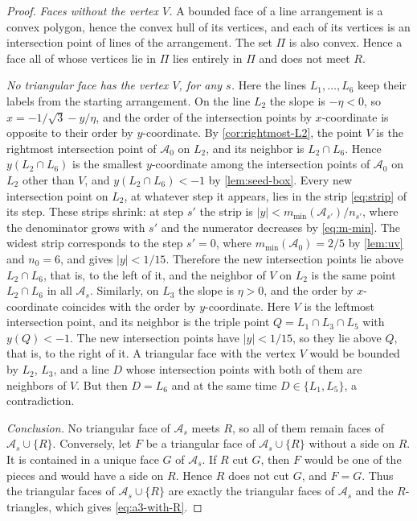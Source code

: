 \begin{proof}
\emph{Faces without the vertex $V$.} A bounded face of a line arrangement is a convex polygon, hence the convex hull of its vertices, and each of its vertices is an intersection point of lines of the arrangement.
The set $\Pi$ is also convex. Hence a face all of whose vertices lie in $\Pi$ lies entirely in $\Pi$ and does not meet $R$.

\emph{No triangular face has the vertex $V$, for any $s$.}
Here the lines $L_1,\ldots,L_6$ keep their labels from the starting arrangement.
On the line $L_2$ the slope is $-\eta<0$, so $x=-1/\sqrt3-y/\eta$, and the order of the intersection points by $x$-coordinate is opposite to their order by $y$-coordinate.
By \cref{cor:rightmost-L2}, the point $V$ is the rightmost intersection point of $\mathcal A_0$ on $L_2$, and its neighbor is $L_2\cap L_6$. Hence $y(L_2\cap L_6)$ is the smallest $y$-coordinate among the intersection points of $\mathcal A_0$ on $L_2$ other than $V$, and $y(L_2\cap L_6)<-1$ by \cref{lem:seed-box}.
Every new intersection point on $L_2$, at whatever step it appears, lies in the strip \eqref{eq:strip} of its step.
These strips shrink: at step $s'$ the strip is $|y|<m_{\min}(\mathcal A_{s'})/n_{s'}$, where the denominator grows with $s'$ and the numerator decreases by \eqref{eq:m-min}.
The widest strip corresponds to the step $s'=0$, where $m_{\min}(\mathcal A_0)=2/5$ by \cref{lem:uv} and $n_0=6$, and gives $|y|<1/15$.
Therefore the new intersection points lie above $L_2\cap L_6$, that is, to the left of it, and the neighbor of $V$ on $L_2$ is the same point $L_2\cap L_6$ in all $\mathcal A_s$.
Similarly, on $L_3$ the slope is $\eta>0$, and the order by $x$-coordinate coincides with the order by $y$-coordinate. Here $V$ is the leftmost intersection point, and its neighbor is the triple point $Q=L_1\cap L_3\cap L_5$ with $y(Q)<-1$. The new intersection points have $|y|<1/15$, so they lie above $Q$, that is, to the right of it.
A triangular face with the vertex $V$ would be bounded by $L_2$, $L_3$, and a line $D$ whose intersection points with both of them are neighbors of $V$. But then $D=L_6$ and at the same time $D\in\{L_1,L_5\}$, a contradiction.

\emph{Conclusion.} No triangular face of $\mathcal A_s$ meets $R$, so all of them remain faces of $\mathcal A_s\cup\{R\}$.
Conversely, let $F$ be a triangular face of $\mathcal A_s\cup\{R\}$ without a side on $R$.
It is contained in a unique face $G$ of $\mathcal A_s$. If $R$ cut $G$, then $F$ would be one of the pieces and would have a side on $R$. Hence $R$ does not cut $G$, and $F=G$.
Thus the triangular faces of $\mathcal A_s\cup\{R\}$ are exactly the triangular faces of $\mathcal A_s$ and the $R$-triangles, which gives \eqref{eq:a3-with-R}.
\end{proof}

